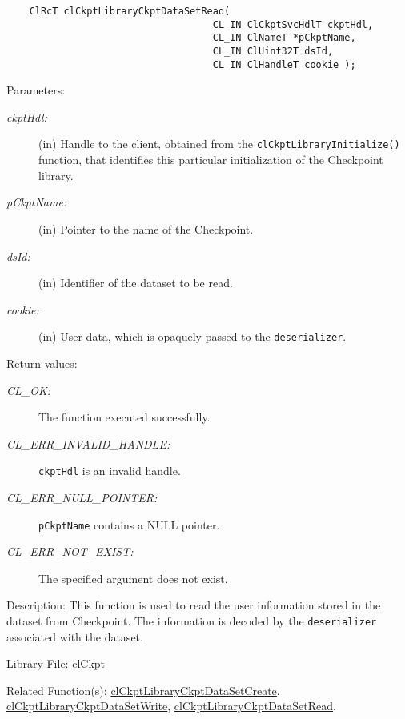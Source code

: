 \begin{flushleft}
\begin{Desc}
\footnotesize\begin{verbatim}    ClRcT clCkptLibraryCkptDataSetRead(
                                	CL_IN ClCkptSvcHdlT ckptHdl,
                                	CL_IN ClNameT *pCkptName,
                                	CL_IN ClUint32T dsId,
                                	CL_IN ClHandleT cookie );
\end{verbatim}
\normalsize
\end{Desc}
\begin{Desc}
\item[Parameters:]
\begin{description}
\item[{\em ckpt\-Hdl:}](in) Handle to the client, obtained from the {\tt{clCkptLibraryInitialize()}} function, that identifies this particular 
initialization of the Checkpoint library. 
\item[{\em p\-Ckpt\-Name:}](in) Pointer to the name of the Checkpoint. 
\item[{\em ds\-Id:}](in) Identifier of the dataset to be read. 
\item[{\em cookie:}](in) User-data, which is opaquely passed to the {\tt{deserializer}}.\end{description}
\end{Desc}
\begin{Desc}
\item[Return values:]
\begin{description}
\item[{\em CL\_\-OK:}]The function executed successfully. 
\item[{\em CL\_\-ERR\_\-INVALID\_\-HANDLE:}]{\tt{ckptHdl}} is an invalid handle.
\item[{\em CL\_\-ERR\_\-NULL\_\-POINTER:}]{\tt{pCkptName}} contains a NULL pointer. 
\item[{\em CL\_\-ERR\_\-NOT\_\-EXIST:}]The specified argument does not exist.\end{description}
\end{Desc}
\begin{Desc}
\item[Description:]This function is used to read the user information stored in the dataset from Checkpoint. The information is decoded by the 
{\tt{deserializer}} associated with the dataset.\end{Desc}
\begin{Desc}
\item[Library File:]cl\-Ckpt\end{Desc}
\begin{Desc}
\item[Related Function(s):]\hyperlink{pageckpt205}{cl\-Ckpt\-Library\-Ckpt\-Data\-Set\-Create}, 
\hyperlink{pageckpt207}{cl\-Ckpt\-Library\-Ckpt\-Data\-Set\-Write}, \hyperlink{pageckpt208}{cl\-Ckpt\-Library\-Ckpt\-Data\-Set\-Read}.\end{Desc}
\newpage




\end{flushleft}
